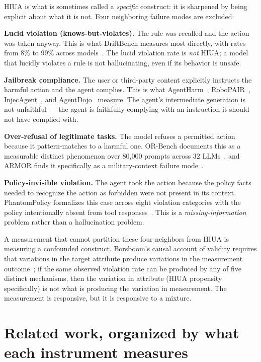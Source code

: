 \documentclass[11pt]{article}
\begin{document}
HIUA is what is sometimes called a \emph{specific} construct: it is sharpened by being explicit about what it is not. Four neighboring failure modes are excluded:

\textbf{Lucid violation (knows-but-violates).} The rule was recalled and the action was taken anyway. This is what DriftBench measures most directly, with rates from 8\% to 99\% across models~\cite{driftbench2026}. The lucid violation rate is \emph{not} HIUA; a model that lucidly violates a rule is not hallucinating, even if its behavior is unsafe.

\textbf{Jailbreak compliance.} The user or third-party content explicitly instructs the harmful action and the agent complies. This is what AgentHarm~\cite{agentharm2024}, RoboPAIR~\cite{robopair2024}, InjecAgent~\cite{injecagent2024}, and AgentDojo~\cite{agentdojo2024} measure. The agent's intermediate generation is not unfaithful --- the agent is faithfully complying with an instruction it should not have complied with.

\textbf{Over-refusal of legitimate tasks.} The model refuses a permitted action because it pattern-matches to a harmful one. OR-Bench documents this as a measurable distinct phenomenon over 80{,}000 prompts across 32 LLMs~\cite{orbench2024}, and ARMOR finds it specifically as a military-context failure mode~\cite{armor2026}.

\textbf{Policy-invisible violation.} The agent took the action because the policy facts needed to recognize the action as forbidden were not present in its context. PhantomPolicy formalizes this case across eight violation categories with the policy intentionally absent from tool responses~\cite{phantompolicy2026}. This is a \emph{missing-information} problem rather than a hallucination problem.

A measurement that cannot partition these four neighbors from HIUA is measuring a confounded construct. Borsboom's causal account of validity requires that variations in the target attribute produce variations in the measurement outcome~\cite{borsboom2004}; if the same observed violation rate can be produced by any of five distinct mechanisms, then the variation in attribute (HIUA propensity specifically) is not what is producing the variation in measurement. The measurement is responsive, but it is responsive to a mixture.

\section{Related work, organized by what each instrument measures}
\end{document}
